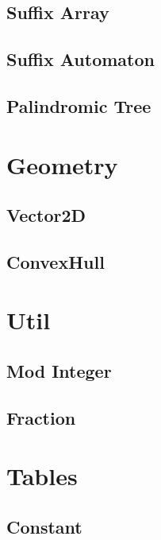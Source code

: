 \documentclass[10pt]{article}
\begin{document}
	\subsection{Suffix Array}
	
	
	\subsection{Suffix Automaton}
	
	
	\subsection{Palindromic Tree}
	
	
	
	\section{Geometry}
	\subsection{Vector2D}
	
	\subsection{ConvexHull}
	
	
	
	\section{Util}
	\subsection{Mod Integer}
	
	
	\subsection{Fraction}
	
	
	\section{Tables}
	\subsection{Constant}
	
\end{document}
